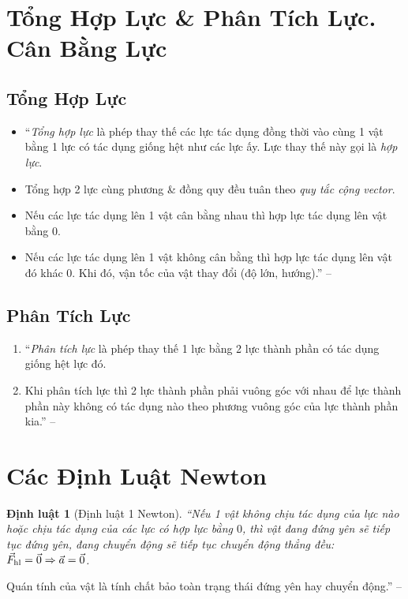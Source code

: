 \documentclass{article}
\newtheorem{dinhluat}{Định luật}
\begin{document}

\section{Tổng Hợp Lực \& Phân Tích Lực. Cân Bằng Lực}

\subsection{Tổng Hợp Lực}
\begin{itemize}
	\item ``{\it Tổng hợp lực} là phép thay thế các lực tác dụng đồng thời vào cùng 1 vật bằng 1 lực có tác dụng giống hệt như các lực ấy. Lực thay thế này gọi là {\it hợp lực}.
	\item Tổng hợp 2 lực cùng phương \& đồng quy đều tuân theo {\it quy tắc cộng vector}.
	\item Nếu các lực tác dụng lên 1 vật cân bằng nhau thì hợp lực tác dụng lên vật bằng $0$.
	\item Nếu các lực tác dụng lên 1 vật không cân bằng thì hợp lực tác dụng lên vật đó khác $0$. Khi đó, vận tốc của vật thay đổi (độ lớn, hướng).'' -- \cite[Chủ đề II: {\it Động Lực Học}, p. 19]{Giang_Hang_Trung2022}
\end{itemize}

\subsection{Phân Tích Lực}
\begin{enumerate}
	\item ``{\it Phân tích lực} là phép thay thế 1 lực bằng 2 lực thành phần có tác dụng giống hệt lực đó.
	\item Khi phân tích lực thì 2 lực thành phần phải vuông góc với nhau để lực thành phần này không có tác dụng nào theo phương vuông góc của lực thành phần kia.'' -- \cite[p. 19]{Giang_Hang_Trung2022}
\end{enumerate}

\section{Các Định Luật Newton}

\begin{dinhluat}[Định luật 1 Newton]
	``Nếu 1 vật không chịu tác dụng của lực nào hoặc chịu tác dụng của các lực có hợp lực bằng $0$, thì vật đang đứng yên sẽ tiếp tục đứng yên, đang chuyển động sẽ tiếp tục chuyển động thẳng đều: $\vec{F}_{\rm hl} = \vec{0}\Rightarrow\vec{a} = \vec{0}$.
\end{dinhluat}
Quán tính của vật là tính chất bảo toàn trạng thái đứng yên hay chuyển động.'' -- \cite[p. 19]{Giang_Hang_Trung2022}
\end{document}

